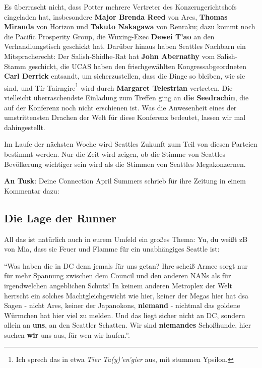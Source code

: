 Es überrascht nicht, dass Potter mehrere Vertreter des Konzerngerichtshofs eingeladen hat, insbesondere \textbf{Major Brenda Reed} von Ares, \textbf{Thomas Miranda} von Horizon und \textbf{Takuto Nakagawa} von Renraku; dazu kommt noch die Pacific Prosperity Group, die Wuxing-Exec \textbf{Dewei T’ao} an den Verhandlungstisch geschickt hat. Darüber hinaus haben Seattles Nachbarn ein Mitspracherecht: Der Salish-Shidhe-Rat hat \textbf{John Abernathy} vom Salish-Stamm geschickt, die UCAS haben den frischgewählten Kongressabgeordneten \textbf{Carl Derrick} entsandt, um sicherzustellen, dass die Dinge so bleiben, wie sie sind, und Tír Tairngire\footnote{Ich sprech das in etwa \textit{Tier Ta(y)'en'gier} aus, mit stummen Ypsilon.} wird durch \textbf{Margaret Telestrian} vertreten. Die vielleicht überraschendste Einladung zum Treffen ging an \textbf{die Seedrachin}, die auf der Konferenz noch nicht erschienen ist. Was die Anwesenheit eines der umstrittensten Drachen der Welt für diese Konferenz bedeutet, lassen wir mal dahingestellt. 

Im Laufe der nächsten Woche wird Seattles Zukunft zum Teil von diesen Parteien bestimmt werden. Nur die Zeit wird zeigen, ob die Stimme von Seattles Bevölkerung wichtiger sein wird als die Stimmen von Seattles Megakonzernen.


\vspace{1em}
\textbf{An Tusk}: Deine Connection April Summers schrieb für ihre Zeitung in einem Kommentar dazu: 


\subsection{Die Lage der Runner}

All das ist natürlich auch in eurem Umfeld ein großes Thema: Yu, du weißt zB von Mia, dass sie Feuer und Flamme für ein unabhängiges Seattle ist:

``Was haben die in DC denn jemals für uns getan? Ihre scheiß Armee sorgt nur für mehr Spannung zwischen dem Council und den anderen NANs als für irgendwelchen angeblichen Schutz! In keinem anderen Metroplex der Welt herrscht ein solches Machtgleichgewicht wie hier, keiner der Megas hier hat dsa Sagen - nicht Ares, keiner der Japanokons, \textbf{niemand} - nichtmal das goldene Würmchen hat hier viel zu melden. Und das liegt sicher nicht an DC, sondern allein an \textbf{uns}, an den Seattler Schatten. Wir sind \textbf{niemandes} Schoßhunde, hier suchen \textbf{wir} uns aus, für wen wir laufen.''. 

